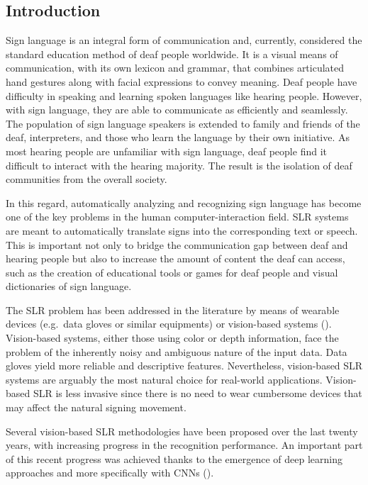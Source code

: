 \subsection{Introduction}
Sign language is an integral form of communication and, currently, considered the standard education method of deaf people worldwide. It is a visual means of communication, with its own lexicon and grammar, that combines articulated hand gestures along with facial expressions to convey meaning. Deaf people have difficulty in speaking and learning spoken languages like hearing people. However, with sign language, they are able to communicate as efficiently and seamlessly. The population of sign language speakers is extended to family and friends of the deaf, interpreters, and those who learn the language by their own initiative. As most hearing people are unfamiliar with sign language, deaf people find it difficult to interact with the hearing majority. The result is the isolation of deaf communities from the overall society.

In this regard, automatically analyzing and recognizing sign language has become one of the key problems in the human computer-interaction field. SLR systems are meant to automatically translate signs into the corresponding text or speech. This is important not only to bridge the communication gap between deaf and hearing people but also to increase the amount of content the deaf can access, such as the creation of educational tools or games for deaf people and visual dictionaries of sign language.

The SLR problem has been addressed in the literature by means of wearable devices (e.g.\ data gloves or similar equipments) or vision-based systems (\citet{Ahdal2012}). Vision-based systems, either those using color or depth information, face the problem of the inherently noisy and ambiguous nature of the input data. Data gloves yield more reliable and descriptive features. Nevertheless, vision-based SLR systems are arguably the most natural choice for real-world applications. Vision-based SLR is less invasive since there is no need to wear cumbersome devices that may affect the natural signing movement.

Several vision-based SLR methodologies have been proposed over the last twenty years, with increasing progress in the recognition performance. An important part of this recent progress was achieved thanks to the emergence of deep learning approaches and more specifically with CNNs (\citet{Pigou2015, Koller2016, Wu2016, Neverova2016, Kumar2017}).

